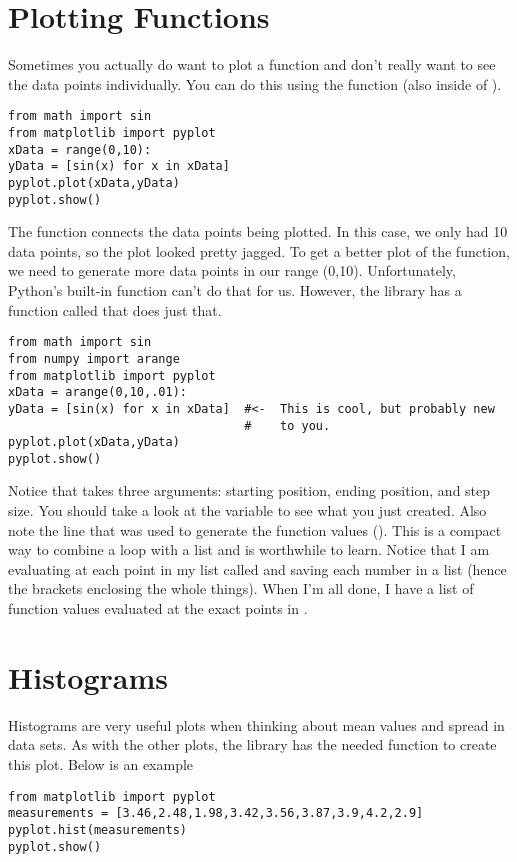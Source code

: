\section{Plotting Functions}

Sometimes you actually do want to plot a function and don't really
want to see the data points individually.  You can do this using the
 function (also inside of ).
\begin{Verbatim}
from math import sin
from matplotlib import pyplot
xData = range(0,10):
yData = [sin(x) for x in xData]
pyplot.plot(xData,yData)
pyplot.show()
\end{Verbatim}
The  function connects the data points being plotted.  In
this case, we only had 10 data points, so the plot looked pretty
jagged.  To get a better plot of the function, we need to generate
more data points in our range (0,10).  Unfortunately, Python's
built-in  function can't do that for us.  However, the
 library has a function called  that does
just that.
\begin{Verbatim}
from math import sin
from numpy import arange
from matplotlib import pyplot
xData = arange(0,10,.01):
yData = [sin(x) for x in xData]  #<-  This is cool, but probably new
                                 #    to you.
pyplot.plot(xData,yData)
pyplot.show()
\end{Verbatim}
Notice that  takes three arguments: starting position,
ending position, and step size.  You should take a look at the
variable  to see what you just created.  Also note the
line that was used to generate the function values ().
This is a compact way to combine a loop with a list and is worthwhile
to learn.  Notice that I am evaluating  at each point
in my list called  and saving each number in a list
(hence the brackets enclosing the whole things).  When
I'm all done, I have a list of function values evaluated at the exact
points in .

\section{Histograms}
Histograms are very useful plots when thinking about mean values and
spread in data sets.  As with the other plots, the library
 has the needed function to create this plot.
Below is an example
\begin{Verbatim}
from matplotlib import pyplot
measurements = [3.46,2.48,1.98,3.42,3.56,3.87,3.9,4.2,2.9]
pyplot.hist(measurements)
pyplot.show()
\end{Verbatim}



